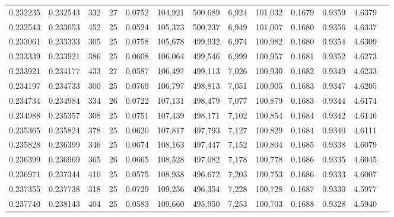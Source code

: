 \begin{tabular}{rrrrrrrrrrrrr}
0.232235 & 0.232543 &   332 &  27 &                                     0.0752 & 104,921 & 500,689 &   6,924 & 101,032 & 0.1679 & 0.9359 & 4.6379 \\
0.232543 & 0.233053 &   452 &  25 &                                     0.0524 & 105,373 & 500,237 &   6,949 & 101,007 & 0.1680 & 0.9356 & 4.6337 \\
0.233061 & 0.233333 &   305 &  25 &                                     0.0758 & 105,678 & 499,932 &   6,974 & 100,982 & 0.1680 & 0.9354 & 4.6309 \\
0.233339 & 0.233921 &   386 &  25 &                                     0.0608 & 106,064 & 499,546 &   6,999 & 100,957 & 0.1681 & 0.9352 & 4.6273 \\
0.233921 & 0.234177 &   433 &  27 &                                     0.0587 & 106,497 & 499,113 &   7,026 & 100,930 & 0.1682 & 0.9349 & 4.6233 \\
0.234197 & 0.234733 &   300 &  25 &                                     0.0769 & 106,797 & 498,813 &   7,051 & 100,905 & 0.1683 & 0.9347 & 4.6205 \\
0.234734 & 0.234984 &   334 &  26 &                                     0.0722 & 107,131 & 498,479 &   7,077 & 100,879 & 0.1683 & 0.9344 & 4.6174 \\
0.234988 & 0.235357 &   308 &  25 &                                     0.0751 & 107,439 & 498,171 &   7,102 & 100,854 & 0.1684 & 0.9342 & 4.6146 \\
0.235365 & 0.235824 &   378 &  25 &                                     0.0620 & 107,817 & 497,793 &   7,127 & 100,829 & 0.1684 & 0.9340 & 4.6111 \\
0.235828 & 0.236399 &   346 &  25 &                                     0.0674 & 108,163 & 497,447 &   7,152 & 100,804 & 0.1685 & 0.9338 & 4.6079 \\
0.236399 & 0.236969 &   365 &  26 &                                     0.0665 & 108,528 & 497,082 &   7,178 & 100,778 & 0.1686 & 0.9335 & 4.6045 \\
0.236971 & 0.237344 &   410 &  25 &                                     0.0575 & 108,938 & 496,672 &   7,203 & 100,753 & 0.1686 & 0.9333 & 4.6007 \\
0.237355 & 0.237738 &   318 &  25 &                                     0.0729 & 109,256 & 496,354 &   7,228 & 100,728 & 0.1687 & 0.9330 & 4.5977 \\
0.237740 & 0.238143 &   404 &  25 &                                     0.0583 & 109,660 & 495,950 &   7,253 & 100,703 & 0.1688 & 0.9328 & 4.5940 \\

\end{tabular}
